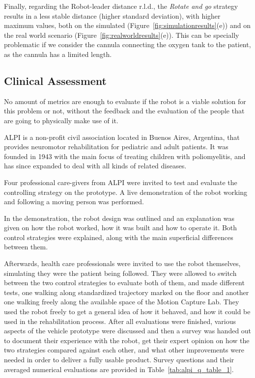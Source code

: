 \documentclass[journal]{IEEEtran}
\begin{document}
Finally, regarding the Robot-leader distance r.l.d., the \textit{Rotate and go} strategy results in a less stable distance (higher standard deviation), with higher maximum values, both on the simulated (Figure~\ref{fig:simulationresults}(e)) and on the real world scenario (Figure~\ref{fig:realworldresults}(e)).  This can be specially problematic if we consider the cannula connecting the oxygen tank to the patient, as the cannula has a limited length.  


\subsection{Clinical Assessment} 
\label{clinical}

No amount of metrics are enough to evaluate if the robot is a viable solution for this problem or not, without the feedback and the evaluation of the people that are going to physically make use of it. 

ALPI is a non-profit civil association located in Buenos Aires, Argentina, that provides neuromotor rehabilitation for pediatric and adult patients. It was founded in 1943 with the main focus of treating children with poliomyelitis, and has since expanded to deal with all kinds of related diseases. 

Four professional care-givers from ALPI  were invited to test and evaluate the controlling strategy on the prototype.  A live demonstration of the robot working and following a moving person was performed.

In the demonstration, the robot design was outlined and an explanation was given on how the robot worked, how it was built and how to operate it. Both control strategies were explained, along with the main superficial differences between them. 

Afterwards, health care professionals were invited to use the robot themselves, simulating they were the patient being followed. They were allowed to switch between the two control strategies to evaluate both of them, and made different tests, one walking along standardized trajectory marked on the floor and another one walking freely along the available space of the Motion Capture Lab. They used the robot freely to get a general idea of how it behaved, and how it could be used in the rehabilitation process. After all evaluations were finished, various aspects of the vehicle prototype were discussed and then a survey was handed out to document their experience with the robot, get their expert opinion on how the two strategies compared against each other, and what other improvements were needed in order to deliver a fully usable product.  Survey questions and their averaged numerical evaluations are provided in Table~\ref{tab:alpi_q_table_1}.
\end{document}
